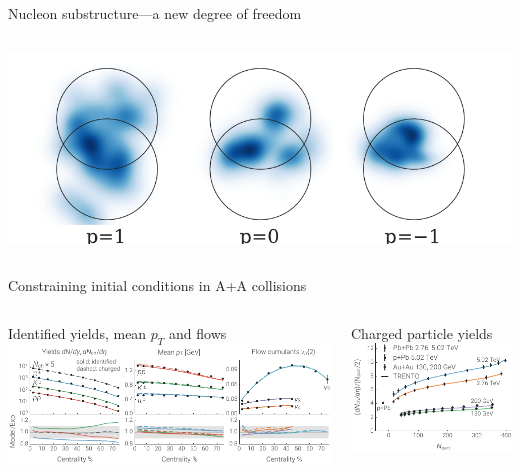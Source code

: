 \documentclass[aspectratio=43]{beamer}
\theoremstyle{definition}
\begin{document}
\begin{frame}[plain]{Nucleon substructure---a new degree of freedom}
\begin{columns}
\begin{column}{.95\textwidth}
\begin{flushleft}
{          \includegraphics[width=.85\columnwidth]{proton_shapes_substructure}
        }
      \end{flushleft}
    \end{column}
  \end{columns}
\end{frame}


\begin{frame}{Constraining initial conditions in A+A collisions}
  \medskip
  \begin{columns}
    \scriptsize
    \begin{column}{.65\textwidth}
      \centering
      Identified yields, mean $p_T$ and flows \\[1ex]
      \includegraphics[width=\columnwidth]{mode_observables}
    \end{column}
    \begin{column}{.35\textwidth}
      \centering
      Charged particle yields \\[1ex]
      \includegraphics[width=\columnwidth]{nch_per_npart}

\end{column}
\end{columns}
\end{frame}
\end{document}
